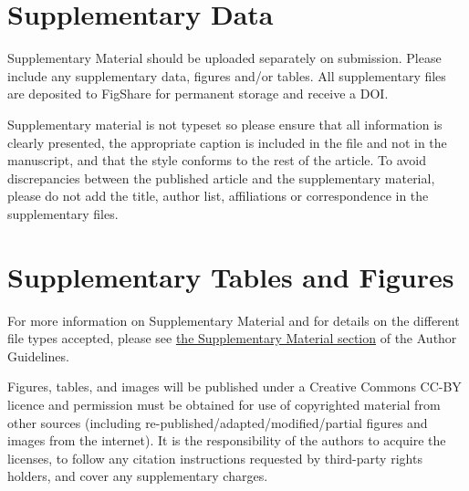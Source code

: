 \documentclass[utf8]{frontiers_suppmat} %
\begin{document}
\onecolumn
{}

\title[Supplementary Material]{{}}


\maketitle


\section{Supplementary Data}

Supplementary Material should be uploaded separately on submission. Please include any supplementary data, figures and/or tables. All supplementary files are deposited to FigShare for permanent storage and receive a DOI.

Supplementary material is not typeset so please ensure that all information is clearly presented, the appropriate caption is included in the file and not in the manuscript, and that the style conforms to the rest of the article. To avoid discrepancies between the published article and the supplementary material, please do not add the title, author list, affiliations or correspondence in the supplementary files.

\section{Supplementary Tables and Figures}

For more information on Supplementary Material and for details on the different file types accepted, please see \href{http://home.frontiersin.org/about/author-guidelines#SupplementaryMaterial}{the Supplementary Material section} of the Author Guidelines.

Figures, tables, and images will be published under a Creative Commons CC-BY licence and permission must be obtained for use of copyrighted material from other sources (including re-published/adapted/modified/partial figures and images from the internet). It is the responsibility of the authors to acquire the licenses, to follow any citation instructions requested by third-party rights holders, and cover any supplementary charges.

\end{document}
